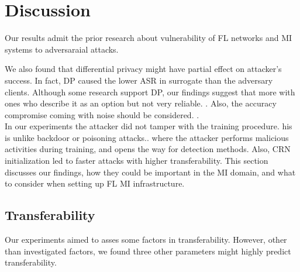 

\section{Discussion}

Our results admit the prior research about vulnerability of FL networks
\cite{goldblum2020dataset,liu2022threats,sun2019can,fang2020local,wang2020attack,song2020analyzing,wilkinson2016fair,van2022ai,miotto2016deep,costa2021covert,bouacida2021vulnerabilities} and MI systems 
 \cite{ma2021understanding,finlayson2019adversarial,gupta2022vulnerability,bortsova2021adversarial}  to adversaraial attacks.


We also found that differential privacy might have partial effect on attacker's success. In fact, DP caused the lower ASR in surrogate than the adversary clients.
Although some research support DP, our findings suggest that more with ones who describe it as an option but not very reliable. \cite{bouacida2021vulnerabilities}. Also, the accuracy compromise coming with noise should be considered. \cite{canonne2020discrete} \cite{wang2019privacy}.
\\In our experiments the attacker did not tamper with the training procedure. his is unlike backdoor or poisoning attacks.\cite{lyu2020privacy}\cite{lyu2020threats}. where the attacker performs malicious activities during training, and opens the way for detection methods.
Also, CRN initialization led to faster attacks with higher transferability. This section discusses our findings, how they could be important in the MI domain, and what to consider when setting up FL MI infrastructure.



\subsection{Transferability}
Our experiments aimed to asses some factors in transferability. However, other than investigated factors, we found three other parameters might highly predict transferability.


